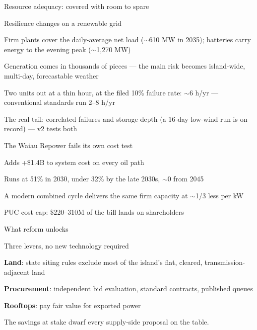 \documentclass[11pt,aspectratio=169]{beamer}
\begin{document}
\begin{frame}{Resource adequacy: covered with room to spare}
\end{frame}

\begin{frame}{Resilience changes on a renewable grid}
\begin{wideitemize}
  \item Firm plants cover the daily-average net load
        (\textcolor{uhslate}{$\sim$610 MW} in 2035); batteries carry
        energy to the evening peak (\textcolor{uhslate}{$\sim$1,270 MW})
  \item Generation comes in thousands of pieces --- the main risk
        becomes island-wide, multi-day, forecastable weather
  \item Two units out at a thin hour, at the filed 10\% failure rate:
        \textcolor{uhgreen}{$\sim$6 h/yr} --- conventional
        standards run 2--8 h/yr
  \item The real tail: correlated failures and storage depth
        (a 16-day low-wind run is on record) --- v2 tests both
\end{wideitemize}
\end{frame}

\begin{frame}{The Waiau Repower fails its own cost test}
\begin{wideitemize}
  \item Adds \textcolor{uhbrick}{+\$1.4B} to system cost on every oil path
  \item Runs at 51\% in 2030, under 32\% by the late 2030s,
        $\sim$0 from 2045
  \item A modern combined cycle delivers the same firm capacity at
        $\sim$1/3 less per kW
  \item PUC cost cap: \$220--310M of the bill lands on shareholders
\end{wideitemize}
\end{frame}

\begin{transitionframe}
  \begin{center}{\Huge \textcolor{black}{What reform unlocks}}\end{center}
\end{transitionframe}

\begin{frame}{Three levers, no new technology required}
\begin{wideitemize}
  \item \textbf{Land}: state siting rules exclude most of the island's
        flat, cleared, transmission-adjacent land
  \item \textbf{Procurement}: independent bid evaluation, standard
        contracts, published queues
  \item \textbf{Rooftops}: pay fair value for exported power
\end{wideitemize}
\vspace{0.4cm}
The savings at stake dwarf every supply-side proposal on the table.
\end{frame}
\end{document}
